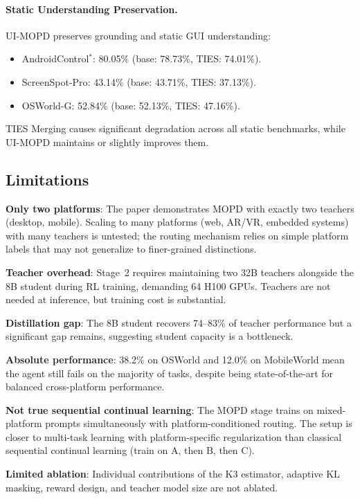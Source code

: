 \documentclass[11pt,a4paper]{article}
\begin{document}
\paragraph{Static Understanding Preservation.} UI-MOPD preserves grounding and static GUI understanding:
\begin{itemize}
\item AndroidControl$^*$: 80.05\% (base: 78.73\%, TIES: 74.01\%).
\item ScreenSpot-Pro: 43.14\% (base: 43.71\%, TIES: 37.13\%).
\item OSWorld-G: 52.84\% (base: 52.13\%, TIES: 47.16\%).
\end{itemize}
TIES Merging causes significant degradation across all static benchmarks, while UI-MOPD maintains or slightly improves them.

\subsection{Limitations}

\textbf{Only two platforms}: The paper demonstrates MOPD with exactly two teachers (desktop, mobile). Scaling to many platforms (web, AR/VR, embedded systems) with many teachers is untested; the routing mechanism relies on simple platform labels that may not generalize to finer-grained distinctions.

\textbf{Teacher overhead}: Stage~2 requires maintaining two 32B teachers alongside the 8B student during RL training, demanding 64 H100 GPUs. Teachers are not needed at inference, but training cost is substantial.

\textbf{Distillation gap}: The 8B student recovers 74--83\% of teacher performance but a significant gap remains, suggesting student capacity is a bottleneck.

\textbf{Absolute performance}: 38.2\% on OSWorld and 12.0\% on MobileWorld mean the agent still fails on the majority of tasks, despite being state-of-the-art for balanced cross-platform performance.

\textbf{Not true sequential continual learning}: The MOPD stage trains on mixed-platform prompts simultaneously with platform-conditioned routing. The setup is closer to multi-task learning with platform-specific regularization than classical sequential continual learning (train on A, then B, then C).

\textbf{Limited ablation}: Individual contributions of the K3 estimator, adaptive KL masking, reward design, and teacher model size are not ablated.
\end{document}
